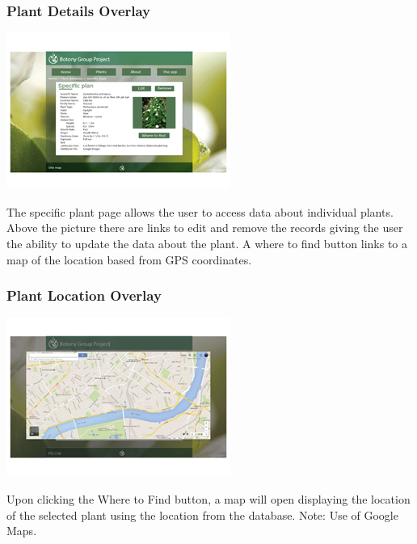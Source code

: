 		\subsubsection{Plant Details Overlay}
			\begin{center}
				\includegraphics[scale=1]{uiDesign/botanyWebPlantDetailsOverlay.png}
			\end{center}
			The specific plant page allows the user to access data about individual plants. Above the picture there are links to edit and remove the records giving the user the ability to update the data about the plant. A where to find button links to a map of the location based from GPS coordinates.

			\subsubsection{Plant Location Overlay}
			\begin{center}
				\includegraphics[scale=1]{uiDesign/botanyWebPlantMap.png}
			\end{center}
			Upon clicking the Where to Find button, a map will open displaying the location of the selected plant using the location from the database. Note: Use of Google Maps.

